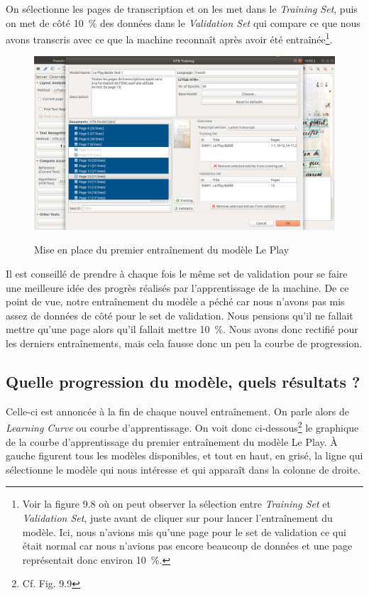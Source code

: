 On sélectionne les pages de transcription et on les met dans le \emph{Training Set}, puis on met de côté 10~\% des données dans le \emph{Validation Set} qui compare ce que nous avons transcris avec ce que la machine reconnaît après avoir été entraînée\footnote{Voir la figure 9.8 où on peut observer la sélection entre \emph{Training Set} et \emph{Validation Set}, juste avant de cliquer sur  pour lancer l'entraînement du modèle. Ici, nous n'avions mis qu'une page pour le set de validation ce qui était normal car nous n'avions pas encore beaucoup de données et une page représentait donc environ 10~\%.}. 
\begin{figure}[ht]
    \centering
    \caption{Mise en place du premier entraînement du modèle Le Play}
    \includegraphics[width=16cm]{images/HTRtraining.png}
    \label{HTRtraining}
\end{figure}
Il est conseillé de prendre à chaque fois le même set de validation pour se faire une meilleure idée des progrès réalisés par l’apprentissage de la machine. De ce point de vue, notre entraînement du modèle a péché car nous n'avons pas mis assez de données de côté pour le set de validation. Nous pensions qu'il ne fallait mettre qu'une page alors qu'il fallait mettre 10~\%. Nous avons donc rectifié pour les derniers entraînements, mais cela fausse donc un peu la courbe de progression.\\

\subsection{Quelle progression du modèle, quels résultats ?}

Celle-ci est annoncée à la fin de chaque nouvel entraînement. On parle alors de \emph{Learning Curve} ou courbe d'apprentissage. On voit donc ci-dessous\footnote{Cf. Fig. 9.9} le graphique de la courbe d'apprentissage du premier entraînement du modèle Le Play. À gauche figurent tous les modèles disponibles, et tout en haut, en grisé, la ligne qui sélectionne le modèle qui nous intéresse et qui apparaît dans la colonne de droite.

